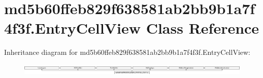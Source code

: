 \hypertarget{classmd5b60ffeb829f638581ab2bb9b1a7f4f3f_1_1EntryCellView}{}\section{md5b60ffeb829f638581ab2bb9b1a7f4f3f.\+Entry\+Cell\+View Class Reference}
\label{classmd5b60ffeb829f638581ab2bb9b1a7f4f3f_1_1EntryCellView}
Inheritance diagram for md5b60ffeb829f638581ab2bb9b1a7f4f3f.\+Entry\+Cell\+View\+:\begin{figure}[H]
\begin{center}
\leavevmode
\includegraphics[height=0.560561cm]{classmd5b60ffeb829f638581ab2bb9b1a7f4f3f_1_1EntryCellView}
\end{center}
\end{figure}
